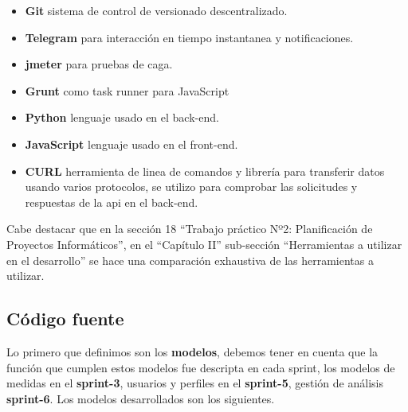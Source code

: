 \begin{itemize}
\item \textbf{Git} sistema de control de versionado descentralizado.
\item \textbf{Telegram} para interacción en tiempo instantanea y notificaciones.
\item \textbf{jmeter} para pruebas de caga.
\item \textbf{Grunt} como task runner para JavaScript
\item \textbf{Python} lenguaje usado en el back-end.
\item \textbf{JavaScript} lenguaje usado en el front-end.
\item \textbf{CURL}  herramienta de linea de comandos y librería para transferir datos usando varios protocolos, se utilizo para comprobar las solicitudes y respuestas de la api en el back-end.
\end{itemize}

Cabe destacar que en la sección 18 ``Trabajo práctico Nº2: Planificación de Proyectos Informáticos'', en el ``Capítulo II'' sub-sección ``Herramientas a utilizar en el desarrollo'' se hace una comparación exhaustiva de las herramientas a utilizar. 

\subsection{Código fuente}

Lo primero que definimos son los \textbf{modelos}, debemos tener en cuenta que la función que cumplen estos modelos fue descripta en cada sprint, los modelos de medidas en el \textbf{sprint-3}, usuarios y perfiles en el \textbf{sprint-5}, gestión de análisis \textbf{sprint-6}. Los modelos desarrollados son los siguientes.

